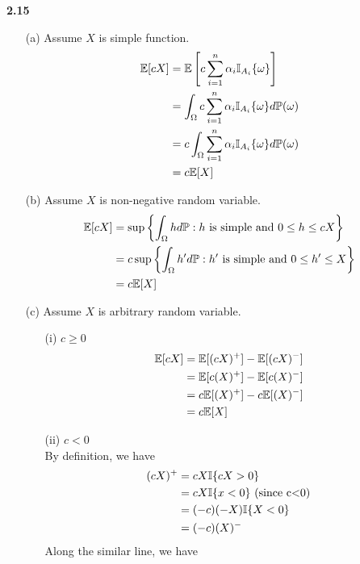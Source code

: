 \noindent\textbf{2.15}
\begin{enumerate}
\item[(a)] Assume $ X$ is simple function.
    \begin{align}
        \mathbb{E}[cX]&=\mathbb{E}\left[{c\sum^{n}_{i=1}\alpha_i\mathbb{I}_{A_i}\{\omega\}}\right] \notag \\
        &=\int_{\Omega}c\sum^n_{i=1}\alpha_i\mathbb{I}_{A_i}\{\omega \}d\mathbb{P}(\omega)\notag\\
        &=c\int_{\Omega}\sum^n_{i=1}\alpha_i\mathbb{I}_{A_i}\{\omega \}d\mathbb{P}(\omega)\notag\\
        &=c\mathbb{E}[X]\notag
    \end{align}
\item[(b)] Assume $X$ is non-negative random variable.
    \begin{align}
        \mathbb{E}[cX]&=\sup\left\{\int_{\Omega}hd\mathbb{P}: h\ \text{is simple and}\ 0\leq h\leq cX \right\}\notag\\
        &=c\sup\left\{\int_{\Omega}h^{\prime}d\mathbb{P}: h^{\prime}\ \text{is simple and}\ 0\leq h^{\prime}\leq X \right\}\notag\\
        &=c\mathbb{E}[X]\notag
    \end{align}
\item[(c)] Assume $X$ is arbitrary random variable.
\begin{enumerate}
    \item[(i)] $c\ge 0$
        \begin{align}
            \mathbb{E}[cX]&=\mathbb{E}[(cX)^+]-\mathbb{E}[(cX)^-]\notag\\
            &=\mathbb{E}[c(X)^+]-\mathbb{E}[c(X)^-]\notag\\
            &=c\mathbb{E}[(X)^+]-c\mathbb{E}[(X)^-]\notag\\
            &=c\mathbb{E}[X]\notag
        \end{align}
    \item[(ii)] $c<0 $ \\ By definition, we have
        \begin{align}
            (cX)^+&=cX\mathbb{I}\{cX>0 \}\notag\\
            &=cX\mathbb{I}\{x<0 \}\ (\text{since c<0})\notag\\
            &=(-c)(-X)\mathbb{I}\{X<0 \}\notag\\
            &=(-c)(X)^-\notag
        \end{align}
        Along the similar line, we have
        \begin{align}

\end{align}
\end{enumerate}
\end{enumerate}
